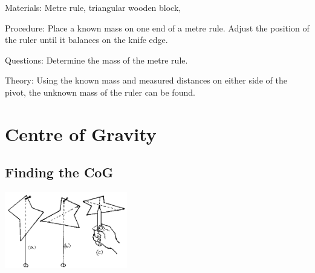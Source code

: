 \begin{multicols}{2}
\begin{description*}
\item[Materials:]{Metre rule, triangular wooden block, }
\item[Procedure:]{Place a known mass on one end of a metre rule. Adjust the position of the ruler until it balances on the knife edge.}
\item[Questions:]{Determine the mass of the metre rule.}
\item[Theory:]{Using the known mass and measured distances on either side of the pivot, the unknown mass of the ruler can be found.}
\end{description*}


\section*{Centre of Gravity} 


\subsection{Finding the CoG}

\begin{center}
\includegraphics[width=0.4\textwidth]{./img/source/cog.png}
\end{center}


\end{multicols}
